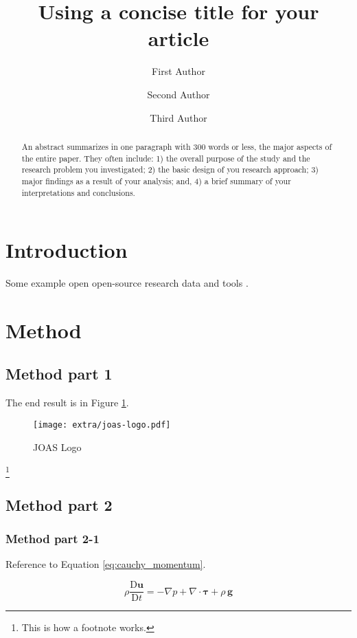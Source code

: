 \documentclass[
  manuscript=proceeding,  %
  layout=preprint,  %
  year=20xx,
  volume=x,
]{extra/joas}
\title{Using a concise title for your article}
\author{First Author}
\affiliation{Institution-1, City, Country}
\author{Second Author}
\affiliation{Institution-2, City, Country}
\author{Third Author}
\affiliation{Institution-3, City, Country}
\begin{document}
\begin{abstract}
  An abstract summarizes in one paragraph with 300 words or less, the major aspects of the entire paper. They often include: 1) the overall purpose of the study and the research problem you investigated; 2) the basic design of you research approach; 3) major findings as a result of your analysis; and, 4) a brief summary of your interpretations and conclusions. 
\end{abstract}


\section{Introduction}

\blindtext 
Some example open open-source research data \cite{schafer2014bringing} and tools \cite{olive2019traffic}. 


\blindtext [2]


\section{Method}

\subsection{Method part 1}

\blindtext The end result is in Figure \ref{fig:logo}.

\begin{figure}[ht!]
  \centering
  \texttt{[image: extra/joas-logo.pdf]}
  \caption{JOAS Logo}
  \label{fig:logo}
\end{figure}

\blindtext\footnote{This is how a footnote works.}

\subsection{Method part 2}

\subsubsection{Method part 2-1}

\blindtext Reference to Equation \ref{eq:cauchy_momentum}.

\begin{equation} \label{eq:cauchy_momentum}
\rho\frac{\mathrm{D} \mathbf{u}}{\mathrm{D} t} = - \nabla p + \nabla \cdot \boldsymbol \tau + \rho\,\mathbf{g}
\end{equation}
\end{document}
